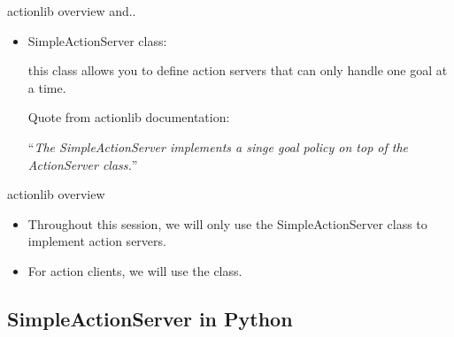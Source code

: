 \documentclass{beamer}
\begin{document}
\begin{frame}{{\ttfamily actionlib} overview}
 and..
    \begin{itemize}

        \item {\ttfamily \color{red} SimpleActionServer} class:  
        
        this class allows you to define action servers that can only handle one goal at a time. 
        
        \vspace{5mm}
        Quote from {\ttfamily actionlib} documentation:
        
        ``\textit{\scriptsize The SimpleActionServer implements a singe goal policy on top of the ActionServer class.}''
    \end{itemize}      
\end{frame}

\begin{frame}{{\ttfamily actionlib} overview}

    \begin{itemize}
        
        \item Throughout this session, we will only use the {\ttfamily \color{red} SimpleActionServer} class to implement action servers.
        
        \vspace{5mm}
        
        \item For action clients, we will use the {} class.

        
    \end{itemize}      
\end{frame}


\subsection{SimpleActionServer in Python}
\end{document}
